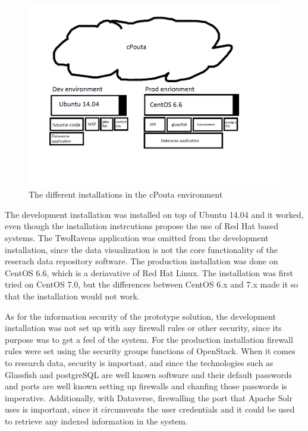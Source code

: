 \begin{figure}
    \begin{centering}
        \includegraphics[width=\textwidth]{images/cpouta}
    \end{centering}
    \caption{The different installations in the cPouta environment}
    \label{fig:cpouta}
\end{figure}

The development installation was installed on top of Ubuntu 14.04 and it
worked, even though the installation instrcutions propose the use of Red Hat
based systems. The TwoRavens application was omitted from the development
installation, since the data visualization is not the core functionality of
the reserach data repository software. The production installation was done
on CentOS 6.6, which is a deriavative of Red Hat Linux. The installation was
first tried on CentOS 7.0, but the differences between CentOS 6.x and 7.x made
it so that the installation would not work.

As for the information security of the prototype solution, the development
installation was not set up with any firewall rules or other security, since
its purpose was to get a feel of the system. For the production installation
firewall rules were set using the security groups functions of OpenStack.
When it comes to research data, security is important, and since the
technologies such as Glassfish and postgreSQL are well known software and
their default passwords and ports are well known setting up firewalls and
chanfing those passwords is imperative. Additionally, with Dataverse,
firewalling the port that Apache Solr uses is important, since it circumvents
the user credentials and it could be used to retrieve any indexed information
in the system.

